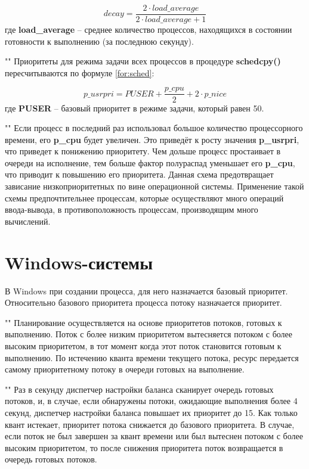 \begin{equation}
    \label{for:bsd}
    decay = \frac{2 \cdot load\_average}{2 \cdot load\_average + 1}
\end{equation}
где \textbf{load\_average} -- среднее количество процессов, находящихся в состоянии готовности к выполнению (за последнюю секунду).

""\newline
\noindent Приоритеты для режима задачи всех процессов в процедуре \textbf{schedcpy()} пересчитываются по формуле \eqref{for:sched}:

\begin{equation}
    \label{for:sched}
    p\_usrpri = PUSER + \frac{p\_cpu}{2} + 2 \cdot p\_nice
\end{equation}
где \textbf{PUSER} -- базовый приоритет в режиме задачи, который равен 50.

""\newline 
\noindent Если процесс в последний раз использовал большое количество процессорного времени, его \textbf{p\_cpu} будет увеличен. Это приведёт к росту значения \textbf{p\_usrpri}, что приведет к понижению приоритету. Чем дольше процесс простаивает в очереди на исполнение, тем больше фактор полураспад уменьшает его \textbf{p\_cpu}, что приводит к повышению его приоритета. Данная схема предотвращает зависание низкоприоритетных по вине операционной системы. Применение такой схемы предпочтительнее процессам, которые осуществляют много операций ввода-вывода, в противоположность процессам, производящим много вычислений.

\section{Windows-системы}

\noindent В Windows при создании процесса, для него назначается базовый приоритет. Относительно базового приоритета процесса потоку назначается приоритет.

""\newline 
\noindent Планирование осуществляется на основе приоритетов потоков, готовых к выполнению. Поток с более низким приоритетом вытесняется потоком с более высоким приоритетом, в тот момент когда этот поток становится готовым к выполнению. По истечению кванта времени текущего потока, ресурс передается самому приоритетному потоку в очереди готовых на выполнение.

""\newline
\noindent Раз в секунду диспетчер настройки баланса сканирует очередь готовых потоков, и, в случае, если обнаружены потоки, ожидающие выполнения более 4 секунд, диспетчер настройки баланса повышает их приоритет до 15. Как только квант истекает, приоритет потока снижается до базового приоритета. В случае, если поток не был завершен за квант времени или был вытеснен потоком с более высоким приоритетом, то после снижения приоритета поток возвращается в очередь готовых потоков.

